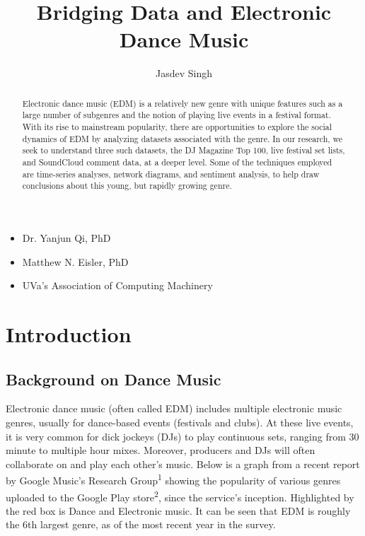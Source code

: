 \documentclass[12pt]{dalcsthesis}
\begin{document}
\mcs 
\title{Bridging Data and Electronic Dance Music}
\author{Jasdev Singh}


\nolistoftables
\nolistoffigures

\frontmatter

\begin{abstract}
Electronic dance music (EDM) is a relatively new genre with unique features such as a large number of subgenres and the  notion of playing live events in a festival format. With its rise to mainstream popularity, there are opportunities to explore the social dynamics of EDM by analyzing datasets associated with the genre. In our research, we seek to understand three such datasets, the DJ Magazine Top 100, live festival set lists, and SoundCloud comment data, at a deeper level. Some of the techniques employed are time-series analyses, network diagrams, and sentiment analysis, to help draw conclusions about this young, but rapidly growing genre.
\end{abstract}

\begin{acknowledgements}
\begin{itemize}
	\item Dr. Yanjun Qi, PhD
	\item Matthew N. Eisler, PhD
	\item UVa's Association of Computing Machinery
\end{itemize}
\end{acknowledgements}

\mainmatter

\chapter{Introduction}

\section{Background on Dance Music}

Electronic dance music (often called EDM) includes multiple electronic music genres, usually for dance-based events (festivals and clubs). At these live events, it is very common for dick jockeys (DJs) to play continuous sets, ranging from 30 minute to multiple hour mixes. Moreover, producers and DJs will often collaborate on and play each other's music. Below is a graph from a recent report by Google Music's Research Group\textsuperscript{1} showing the popularity of various genres uploaded to the Google Play store\textsuperscript{2}, since the service's inception. Highlighted by the red box is Dance and Electronic music. It can be seen that EDM is roughly the 6th largest genre, as of the most recent year in the survey.
\end{document}
